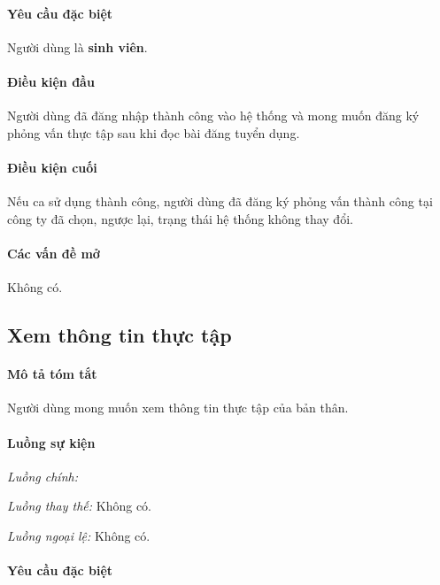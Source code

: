 \documentclass[./../main.tex]{subfiles}
\begin{document}
\paragraph*{Yêu cầu đặc biệt}

Người dùng là \textbf{sinh viên}.

\paragraph*{Điều kiện đầu}

Người dùng đã đăng nhập thành công vào hệ thống và mong muốn đăng ký
phỏng vấn thực tập sau khi đọc bài đăng tuyển dụng.

\paragraph*{Điều kiện cuối}

Nếu ca sử dụng thành công, người dùng đã đăng ký phỏng vấn thành công
tại công ty đã chọn, ngược lại, trạng thái hệ thống không thay đổi.

\paragraph*{Các vấn đề mở}

Không có.

\subsection{Xem thông tin thực tập}

\paragraph*{Mô tả tóm tắt}

Người dùng mong muốn xem thông tin thực tập của bản thân.

\paragraph*{Luồng sự kiện}

\emph{Luồng chính:}

\emph{Luồng thay thế:} Không có.

\emph{Luồng ngoại lệ:} Không có.

\paragraph*{Yêu cầu đặc biệt}
\end{document}
